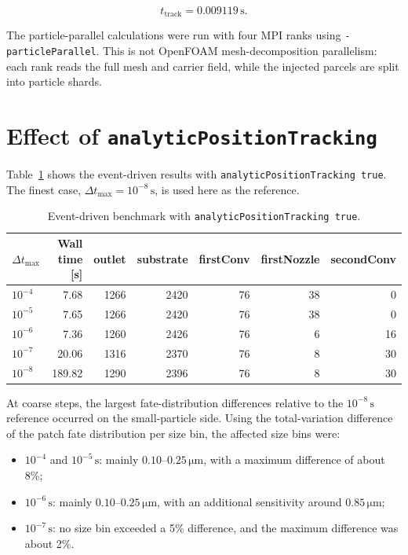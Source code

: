 \documentclass[11pt]{article}
\begin{document}
\[
    t_\mathrm{track}=0.009119\,\mathrm{s}.
\]

The particle-parallel calculations were run with four MPI ranks using
\texttt{-particleParallel}.  This is not OpenFOAM mesh-decomposition parallelism:
each rank reads the full mesh and carrier field, while the injected parcels are
split into particle shards.

\section{Effect of \texttt{analyticPositionTracking}}

Table~\ref{tab:true-event} shows the event-driven results with
\texttt{analyticPositionTracking true}.  The finest case,
\(\Delta t_{\max}=10^{-8}\,\mathrm{s}\), is used here as the reference.

\begin{table}[h]
\centering
\caption{Event-driven benchmark with \texttt{analyticPositionTracking true}.}
\label{tab:true-event}
\begin{tabular}{@{}lrrrrrr@{}}
\toprule
\(\Delta t_{\max}\) & Wall time [s] & outlet & substrate & firstConv & firstNozzle & secondConv \\
\midrule
\(10^{-4}\) & 7.68   & 1266 & 2420 & 76 & 38 & 0  \\
\(10^{-5}\) & 7.65   & 1266 & 2420 & 76 & 38 & 0  \\
\(10^{-6}\) & 7.36   & 1260 & 2426 & 76 & 6  & 16 \\
\(10^{-7}\) & 20.06  & 1316 & 2370 & 76 & 8  & 30 \\
\(10^{-8}\) & 189.82 & 1290 & 2396 & 76 & 8  & 30 \\
\bottomrule
\end{tabular}
\end{table}

At coarse steps, the largest fate-distribution differences relative to the
\(10^{-8}\,\mathrm{s}\) reference occurred on the small-particle side.  Using
the total-variation difference of the patch fate distribution per size bin, the
affected size bins were:

\begin{itemize}
    \item \(10^{-4}\) and \(10^{-5}\,\mathrm{s}\): mainly
    \(0.10\)--\(0.25\,\si{\micro\metre}\), with a maximum difference of about
    8\%;
    \item \(10^{-6}\,\mathrm{s}\): mainly \(0.10\)--\(0.25\,\si{\micro\metre}\),
    with an additional sensitivity around \(0.85\,\si{\micro\metre}\);
    \item \(10^{-7}\,\mathrm{s}\): no size bin exceeded a 5\% difference, and
    the maximum difference was about 2\%.
\end{itemize}
\end{document}
